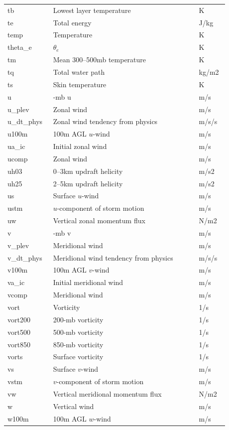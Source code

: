 \documentclass[11pt,fleqn]{report}              %
\begin{document}
\begin{enumerate}
\begin{enumerate}
{\begin{longtable}{p{0.17\linewidth} | p{0.6\linewidth} | p{0.11\linewidth} }
  tb & Lowest layer temperature & K \\
  te & Total energy & J/kg \\
  temp & Temperature & K \\
  theta\_e & $\theta_e$ & K \\
  tm & Mean 300--500mb temperature & K \\
  tq & Total water path & kg/m2 \\
  ts & Skin temperature & K \\
  u & -mb u & m/s \\
  u\_plev & Zonal wind & m/s \\
  u\_dt\_phys & Zonal wind tendency from physics & m/s/s \\
  u100m & 100m AGL $u$-wind & m/s \\
  ua\_ic & Initial zonal wind & m/s \\
  ucomp & Zonal wind & m/s \\
  uh03 & 0--3km updraft helicity & m/s2 \\
  uh25 & 2--5km updraft helicity & m/s2 \\
  us & Surface $u$-wind & m/s \\
  ustm & $u$-component of storm motion & m/s \\
  uw & Vertical zonal momentum flux & N/m2 \\
  v & -mb v & m/s \\
  v\_plev & Meridional wind & m/s \\
  v\_dt\_phys & Meridional wind tendency from physics & m/s/s \\
  v100m & 100m AGL $v$-wind & m/s \\
  va\_ic & Initial meridional wind & m/s \\
  vcomp & Meridional wind & m/s \\
  vort & Vorticity & 1/s \\
  vort200 & 200-mb vorticity & 1/s \\
  vort500 & 500-mb vorticity & 1/s \\
  vort850 & 850-mb vorticity & 1/s \\
  vorts & Surface vorticity & 1/s \\
  vs & Surface $v$-wind & m/s \\
  vstm & $v$-component of storm motion & m/s \\
  vw & Vertical meridional momentum flux & N/m2 \\
  w & Vertical wind & m/s \\  
  w100m & 100m AGL $w$-wind & m/s \\  

\end{longtable}}
\end{enumerate}
\end{enumerate}
\end{document}
